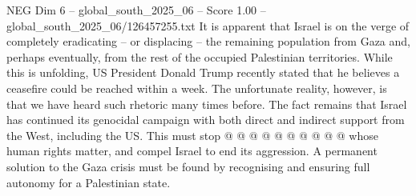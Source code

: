 \begin{textsample}{NEG Dim 6 – global\_south\_2025\_06 – Score 1.00 – global\_south\_2025\_06/126457255.txt}
It is apparent that Israel is on the verge of completely eradicating -- or displacing -- the remaining population from Gaza and, perhaps eventually, from the rest of the occupied Palestinian territories.
While this is unfolding, US President Donald Trump recently stated that he believes a ceasefire could be reached within a week.
The unfortunate reality, however, is that we have heard such rhetoric many times before.
The fact remains that Israel has continued its genocidal campaign with both direct and indirect support from the West, including the US.
This must stop @ @ @ @ @ @ @ @ @ @ whose human rights matter, and compel Israel to end its aggression.
A permanent solution to the Gaza crisis must be found by recognising and ensuring full autonomy for a Palestinian state.

\end{textsample}
